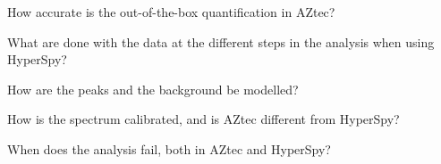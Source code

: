 \begin{subprob} \label{subproblem1}
    How accurate is the out-of-the-box quantification in AZtec?
\end{subprob}
\begin{subprob} \label{subproblem2}
    What are done with the data at the different steps in the analysis when using HyperSpy?
\end{subprob}
\begin{subprob} \label{subproblem3}
    How are the peaks and the background be modelled?
\end{subprob}
\begin{subprob} \label{subproblem4}
    How is the spectrum calibrated, and is AZtec different from HyperSpy?
\end{subprob}
\begin{subprob} \label{subproblem6}
    When does the analysis fail, both in AZtec and HyperSpy?
\end{subprob}



%
%



